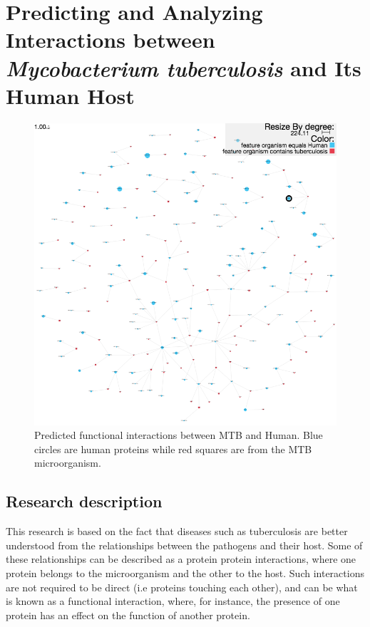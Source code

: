 \section{Predicting and Analyzing Interactions between \emph{Mycobacterium tuberculosis} and Its Human Host} \label{sec:mb_human}
\begin{figure}
\centering
\includegraphics[width=5in]{figures/pinv_human_mtb.png}
\caption[Predicted functional interactions between MTB and Human]{Predicted functional interactions between MTB and Human. Blue circles are human proteins while red squares are from the MTB microorganism.
\label{fig:pinv_human_mtb}}
\end{figure}

\subsection{Research description}
This research is based on the fact that diseases such as tuberculosis are better understood from the relationships between the pathogens and their host. Some of these relationships can be described as a protein protein interactions, where one protein belongs to the microorganism and the other to the host. Such interactions are not required to be direct (i.e proteins touching each other), and can be what is known as a functional interaction, where, for instance,  the presence of one protein has an effect on the function of another protein. 

